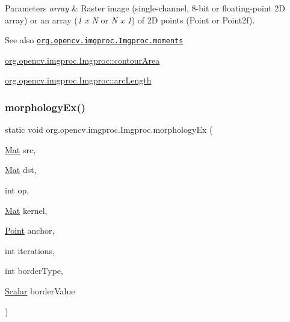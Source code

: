 \begin{DoxyParams}{Parameters}
{\em array} & Raster image (single-\/channel, 8-\/bit or floating-\/point 2D array) or an array ({\itshape 1 x N} or {\itshape N x 1}) of 2D points ({\ttfamily Point} or {\ttfamily Point2f}).\\
\hline
\end{DoxyParams}
\begin{DoxySeeAlso}{See also}
\href{http://docs.opencv.org/modules/imgproc/doc/structural_analysis_and_shape_descriptors.html#moments}{\tt org.\+opencv.\+imgproc.\+Imgproc.\+moments} 

\mbox{\hyperlink{classorg_1_1opencv_1_1imgproc_1_1_imgproc_a0b9b82e8b2461a102788628c8b86d1a1}{org.\+opencv.\+imgproc.\+Imgproc\+::contour\+Area}} 

\mbox{\hyperlink{classorg_1_1opencv_1_1imgproc_1_1_imgproc_a7e92ef5f2b2d486e256ee5e813de19c6}{org.\+opencv.\+imgproc.\+Imgproc\+::arc\+Length}} 
\end{DoxySeeAlso}
\mbox{\label{classorg_1_1opencv_1_1imgproc_1_1_imgproc_a72708dff026d005db5a9534c9b2b4aae}} 
\subsubsection{\texorpdfstring{morphology\+Ex()}{morphologyEx()}\hspace{0.1cm}{\footnotesize\ttfamily [1/3]}}
{\footnotesize\ttfamily static void org.\+opencv.\+imgproc.\+Imgproc.\+morphology\+Ex (\begin{DoxyParamCaption}\item[{\mbox{\hyperlink{classorg_1_1opencv_1_1core_1_1_mat}{Mat}}}]{src,  }\item[{\mbox{\hyperlink{classorg_1_1opencv_1_1core_1_1_mat}{Mat}}}]{dst,  }\item[{int}]{op,  }\item[{\mbox{\hyperlink{classorg_1_1opencv_1_1core_1_1_mat}{Mat}}}]{kernel,  }\item[{\mbox{\hyperlink{classorg_1_1opencv_1_1core_1_1_point}{Point}}}]{anchor,  }\item[{int}]{iterations,  }\item[{int}]{border\+Type,  }\item[{\mbox{\hyperlink{classorg_1_1opencv_1_1core_1_1_scalar}{Scalar}}}]{border\+Value }\end{DoxyParamCaption})\hspace{0.3cm}{\ttfamily [static]}}

